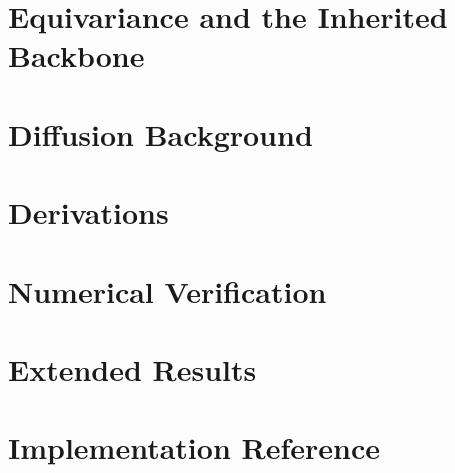 \documentclass[11pt,a4paper]{report}
\theoremstyle{plain}
\theoremstyle{definition}
\theoremstyle{remark}
\newif\ifdraftmode
\newcommand{\dnote}[2]{\ifdraftmode{\sffamily\small\color{DraftBlue}\textbf{[#1]}\ #2}\fi}
\begin{document}
\appendix

\chapter{Equivariance and the Inherited Backbone}
\label{app:equivariance}
\dnote{DRAFT}{Retained from the earlier draft and not currently referenced by
the main text. The main text is written to stand without the appendices.}

\chapter{Diffusion Background}
\label{app:diffusion}
\dnote{DRAFT}{Retained from the earlier draft.}

\chapter{Derivations}
\label{app:derivations}
\dnote{DRAFT}{Retained from the earlier draft.}

\chapter{Numerical Verification}
\label{app:numerics}
\dnote{DRAFT}{Retained from the earlier draft.}

\chapter{Extended Results}
\label{app:extended}
\dnote{DRAFT}{Retained from the earlier draft.}

\chapter{Implementation Reference}
\label{app:implementation}
\dnote{DRAFT}{Retained from the earlier draft.}
\end{document}
